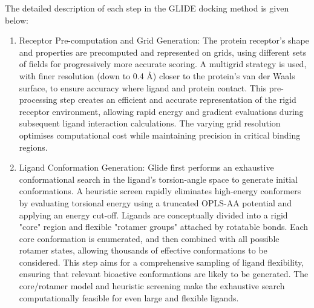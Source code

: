 \documentclass[11pt]{article}
\begin{document}
The detailed description of each step in the GLIDE docking method is given below:
\begin{enumerate}
    \item Receptor Pre-computation and Grid Generation: The protein receptor's shape and properties are precomputed and represented on grids, using different sets of fields for progressively more accurate scoring. A multigrid strategy is used, with finer resolution (down to 0.4 Å) closer to the protein's van der Waals surface, to ensure accuracy where ligand and protein contact. This pre-processing step creates an efficient and accurate representation of the rigid receptor environment, allowing rapid energy and gradient evaluations during subsequent ligand interaction calculations. The varying grid resolution optimises computational cost while maintaining precision in critical binding regions.

    \item Ligand Conformation Generation: Glide first performs an exhaustive conformational search in the ligand's torsion-angle space to generate initial conformations. A heuristic screen rapidly eliminates high-energy conformers by evaluating torsional energy using a truncated OPLS-AA potential and applying an energy cut-off. Ligands are conceptually divided into a rigid "core" region and flexible "rotamer groups" attached by rotatable bonds. Each core conformation is enumerated, and then combined with all possible rotamer states, allowing thousands of effective conformations to be considered. This step aims for a comprehensive sampling of ligand flexibility, ensuring that relevant bioactive conformations are likely to be generated. The core/rotamer model and heuristic screening make the exhaustive search computationally feasible for even large and flexible ligands. 


\end{enumerate}
\end{document}
